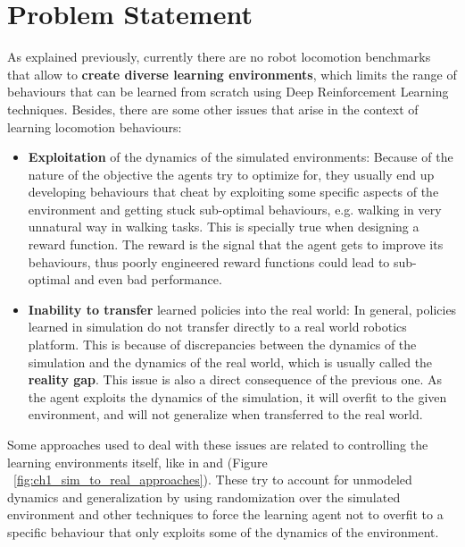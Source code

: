 \section{Problem Statement}
\label{sec:problem}

As explained previously, currently there are no robot locomotion benchmarks that allow
to \textbf{create diverse learning environments}, which limits the range of behaviours that can be learned
from scratch using Deep Reinforcement Learning techniques. Besides, there are some other issues 
that arise in the context of learning locomotion behaviours:

\begin{itemize}
    \item \textbf{Exploitation} of the dynamics of the simulated environments: 
            Because of the nature of the objective the agents try to optimize for, they usually
            end up developing behaviours that cheat by exploiting some specific aspects of the environment
            and getting stuck sub-optimal behaviours, e.g. walking in very unnatural way in walking tasks.
            This is specially true when designing a reward function. The reward is the signal
            that the agent gets to improve its behaviours, 
            thus poorly engineered reward functions could lead to sub-optimal and even bad performance.
    \item \textbf{Inability to transfer} learned  policies into the real world:
            In general, policies learned in simulation do not transfer directly to a real world robotics
            platform. This is because of discrepancies between the dynamics of the simulation and
            the dynamics of the real world, which is usually called the \textbf{reality gap}.
            This issue is also a direct consequence of the previous one. As the agent exploits the 
            dynamics of the simulation, it will overfit to the given environment, and will 
            not generalize when transferred to the real world.
\end{itemize}

Some approaches used to deal with these issues are related to controlling the learning 
environments itself, like in \citeauthor{GoogleBrainSim2Real} and \citeauthor{OpenAISim2real} (Figure ~\ref{fig:ch1_sim_to_real_approaches}).
These try to account for unmodeled dynamics and generalization by using randomization
over the simulated environment and other techniques to force the learning agent not to 
overfit to a specific behaviour that only exploits some of the dynamics of the environment.

